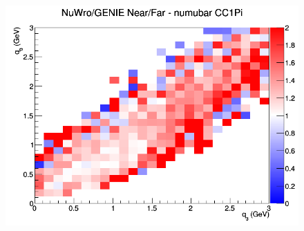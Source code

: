 \documentclass[12pt]{article}
\begin{document}
\begin{figure}[h]
\endminipage
{}
\includegraphics[width=\linewidth]{eff_q0_q3/FGT/ratios/CC1Pi_NuWro_GENIE_numubar_NF_q3_q0.png}
\endminipage
\newline
\end{figure}
\clearpage
\end{document}
